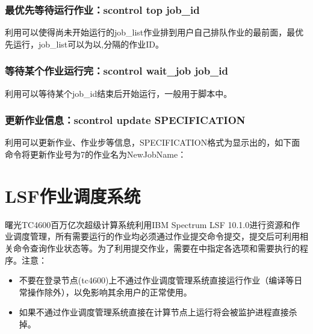 \documentclass[a4paper,12pt,english]{sphinxmanual}
\begin{document}
\sphinxAtStartPar
{}


\subsection{最优先等待运行作业：scontrol top job\_id}
\label{\detokenize{slurm/slurm:scontrol-top-job-id}}
\sphinxAtStartPar
利用可以使得尚未开始运行的job\_list作业排到用户自己排队作业的最前面，最优先运行，job\_list可以为以,分隔的作业ID。

\sphinxAtStartPar
{}


\subsection{等待某个作业运行完：scontrol wait\_job job\_id}
\label{\detokenize{slurm/slurm:scontrol-wait-job-job-id}}
\sphinxAtStartPar
利用可以等待某个job\_id结束后开始运行，一般用于脚本中。

\sphinxAtStartPar
{}


\subsection{更新作业信息：scontrol update SPECIFICATION}
\label{\detokenize{slurm/slurm:scontrol-update-specification}}
\sphinxAtStartPar
利用可以更新作业、作业步等信息，SPECIFICATION格式为显示出的，如下面命令将更新作业号为7的作业名为NewJobName：

\sphinxAtStartPar
{}

\sphinxstepscope


\chapter{LSF作业调度系统}
\label{\detokenize{lsf/lsf:lsf}}\label{\detokenize{lsf/lsf::doc}}
\sphinxAtStartPar
曙光TC4600百万亿次超级计算系统利用IBM Spectrum LSF 10.1.0进行资源和作业调度管理，所有需要运行的作业均必须通过作业提交命令提交，提交后可利用相关命令查询作业状态等。为了利用提交作业，需要在中指定各选项和需要执行的程序。注意：
\begin{itemize}
\item {} 
\sphinxAtStartPar
不要在登录节点(tc4600)上不通过作业调度管理系统直接运行作业（编译等日常操作除外），以免影响其余用户的正常使用。

\item {} 
\sphinxAtStartPar
如果不通过作业调度管理系统直接在计算节点上运行将会被监护进程直接杀掉。

\end{itemize}
\end{document}
